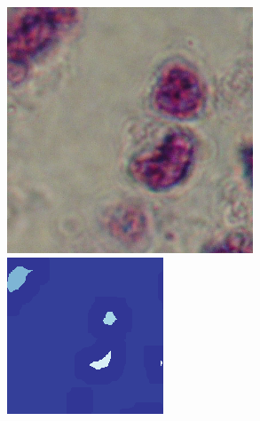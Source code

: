 \begin{figure}[t!]
	\includegraphics[width=0.97\linewidth]{Figures/Chapter2/6a3.png}	
	\includegraphics[width=0.97\linewidth]{Figures/Chapter2/6b3.png}	

\end{figure}
